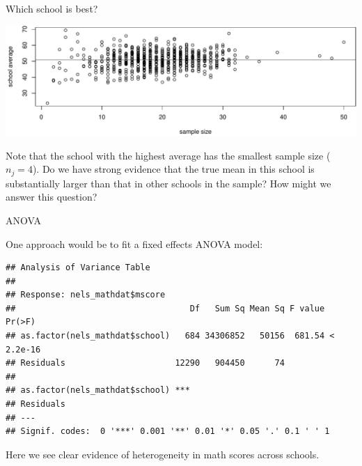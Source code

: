 \documentclass[ignorenonframetext,]{beamer}
\newenvironment{Shaded}{\begin{snugshade}}{\end{snugshade}}
\newcommand{\KeywordTok}[1]{\textcolor[rgb]{0.13,0.29,0.53}{\textbf{#1}}}
\newcommand{\DecValTok}[1]{\textcolor[rgb]{0.00,0.00,0.81}{#1}}
\newcommand{\OperatorTok}[1]{\textcolor[rgb]{0.81,0.36,0.00}{\textbf{#1}}}
\newcommand{\NormalTok}[1]{#1}
\begin{document}
\begin{frame}{Which school is best?}

\includegraphics{ancova_01_deck_files/figure-beamer/nelsplot2-1.pdf}

Note that the school with the highest average has the smallest sample
size (\(n_j=4\)). Do we have strong evidence that the true mean in this
school is substantially larger than that in other schools in the sample?
How might we answer this question?

\end{frame}

\begin{frame}[fragile]{ANOVA}

One approach would be to fit a fixed effects ANOVA model:

\begin{Shaded}
\end{Shaded}

\begin{verbatim}
## Analysis of Variance Table
## 
## Response: nels_mathdat$mscore
##                                   Df   Sum Sq Mean Sq F value    Pr(>F)
## as.factor(nels_mathdat$school)   684 34306852   50156  681.54 < 2.2e-16
## Residuals                      12290   904450      74                  
##                                   
## as.factor(nels_mathdat$school) ***
## Residuals                         
## ---
## Signif. codes:  0 '***' 0.001 '**' 0.01 '*' 0.05 '.' 0.1 ' ' 1
\end{verbatim}

Here we see clear evidence of heterogeneity in math scores across
schools.

\end{frame}
\end{document}
